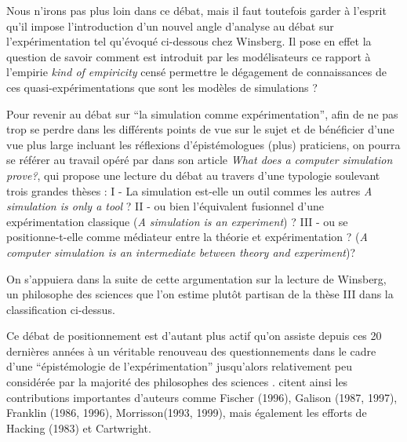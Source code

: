 Nous n'irons pas plus loin dans ce débat, mais il faut toutefois garder à l'esprit qu'il impose l'introduction \autocite{Phan2010, Varenne2013b} d'un nouvel angle d'analyse au débat sur l'expérimentation tel qu'évoqué ci-dessous chez Winsberg. Il pose en effet la question de savoir comment est introduit par les modélisateurs ce rapport à l'empirie \textit{kind of empiricity} censé permettre le dégagement de connaissances de ces quasi-expérimentations que sont les modèles de simulations \autocite{Phan2010} ?

Pour revenir au débat sur \enquote{la simulation comme expérimentation}, afin de ne pas trop se perdre dans les différents points de vue sur le sujet et de  bénéficier d'une vue plus large incluant les réflexions d'épistémologues (plus) praticiens, on pourra se référer au travail opéré par \textcite{Varenne2001} dans son article \textit{What does a computer simulation prove?}, qui propose une lecture du débat au travers d'une typologie soulevant trois grandes thèses : I - La simulation est-elle un outil commes les autres \textit{A simulation is only a tool} ? II - ou bien l'équivalent fusionnel d'une expérimentation classique (\textit{A simulation is an experiment}) ? III - ou se positionne-t-elle comme médiateur entre la théorie et expérimentation ? (\textit{A computer simulation is an intermediate between theory and experiment})?



On s'appuiera dans la suite de cette argumentation sur la lecture de Winsberg, un philosophe des sciences que l'on estime plutôt partisan de la thèse III dans la classification ci-dessus.

Ce débat de positionnement est d'autant plus actif qu'on assiste depuis ces 20 dernières années à un véritable renouveau des questionnements dans le cadre d'une \enquote{épistémologie de l'expérimentation} jusqu'alors relativement peu considérée par la majorité des philosophes des sciences . \textcites{Phan2008, Phan2010} citent ainsi les contributions importantes d'auteurs comme Fischer (1996), Galison (1987, 1997), Franklin (1986, 1996), Morrisson(1993, 1999), mais également les efforts de Hacking (1983) et Cartwright.

